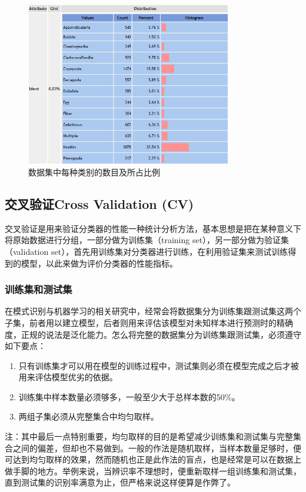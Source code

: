 \documentclass[12pt]{article}
\begin{document}
\begin{figure}[!ht]
\centering
\includegraphics[width=0.8\textwidth]{每个类别所占比例.png}
\caption{数据集中每种类别的数目及所占比例}
\label{fig: ratio}
\end{figure} 

\subsection{交叉验证Cross Validation (CV)}
\label{cv}
交叉验证是用来验证分类器的性能一种统计分析方法，基本思想是把在某种意义下将原始数据进行分组，一部分做为训练集（training set），另一部分做为验证集（validation set），首先用训练集对分类器进行训练，在利用验证集来测试训练得到的模型，以此来做为评价分类器的性能指标。
\subsubsection{训练集和测试集}

在模式识别与机器学习的相关研究中，经常会将数据集分为训练集跟测试集这两个子集，前者用以建立模型，后者则用来评估该模型对未知样本进行预测时的精确度，正规的说法是泛化能力。怎么将完整的数据集分为训练集跟测试集，必须遵守如下要点：
\begin{enumerate}
    \item 只有训练集才可以用在模型的训练过程中，测试集则必须在模型完成之后才被用来评估模型优劣的依据。
    \item 训练集中样本数量必须够多，一般至少大于总样本数的50\%。
    \item 两组子集必须从完整集合中均匀取样。
\end{enumerate}

        {\color{blue}注：}其中最后一点特别重要，均匀取样的目的是希望减少训练集和测试集与完整集合之间的偏差，但却也不易做到。一般的作法是随机取样，当样本数量足够时，便可达到均匀取样的效果，然而随机也正是此作法的盲点，也是经常是可以在数据上做手脚的地方。举例来说，当辨识率不理想时，便重新取样一组训练集和测试集，直到测试集的识别率满意为止，但严格来说这样便算是作弊了。
        
\end{document}
